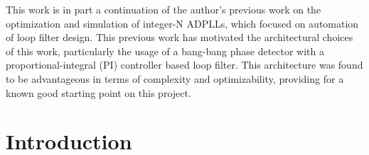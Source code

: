 	\large\fontfamily{\rmdefault}\selectfont 
	\par This work is in part a continuation of the author's previous work \cite{Me} on the optimization and simulation of integer-N ADPLLs, which focused on automation of loop filter design. This previous work has motivated the architectural choices of this work, particularly the usage of a bang-bang phase detector with a proportional-integral (PI) controller based loop filter. This architecture was found to be advantageous in terms of complexity and optimizability, providing for a known good starting point on this project.


	\fontfamily{\sfdefault}\selectfont 
	\thispagestyle{nohdr}
	\null\pagebreak
	\tableofcontents
	\pagebreak
	\listoffigures
	\listoftables


	\fontfamily{\rmdefault}\selectfont 
	\pagebreak
	\FloatBarrier
	
	\null

	\pagebreak\FloatBarrier

	\section{Introduction}\label{intro}
	
	\pagebreak\FloatBarrier


	\pagebreak
